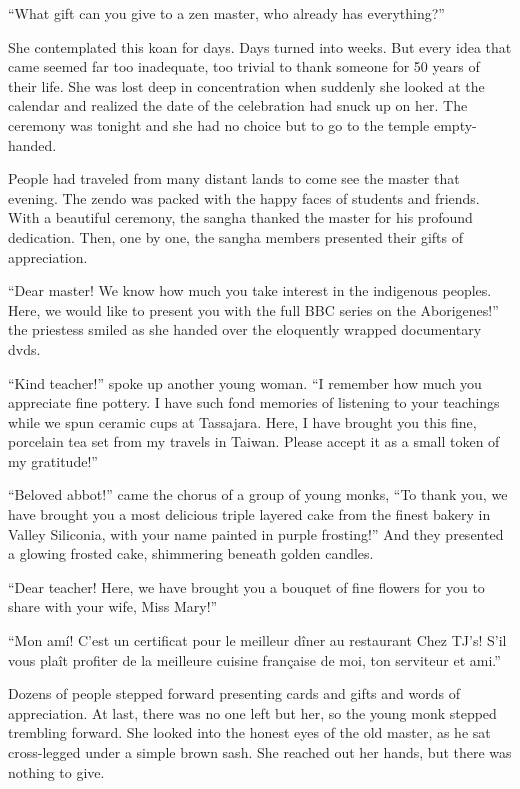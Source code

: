 \documentclass{book}
\begin{document}
``What gift can you give to a zen master, who already has everything?''

She contemplated this koan for days. Days turned into weeks. But every idea
that came seemed far too inadequate, too trivial to thank someone for 50 years
of their life. She was lost deep in concentration when suddenly she looked at
the calendar and realized the date of the celebration had snuck up on her. The
ceremony was tonight and she had no choice but to go to the temple
empty-handed.

People had traveled from many distant lands to come see the master that
evening. The zendo was packed with the happy faces of students and friends.
With a beautiful ceremony, the sangha thanked the master for his profound
dedication. Then, one by one, the sangha members presented their gifts of
appreciation. 

``Dear master! We know how much you take interest in the indigenous peoples.
Here, we would like to present you with the full BBC series on the
Aborigenes!'' the priestess smiled as she handed over the eloquently wrapped
documentary dvds. 

``Kind teacher!'' spoke up another young woman. ``I remember how much you
appreciate fine pottery. I have such fond memories of listening to your
teachings while we spun ceramic cups at Tassajara. Here, I have brought you
this fine, porcelain tea set from my travels in Taiwan. Please accept it as a
small token of my gratitude!''

``Beloved abbot!'' came the chorus of a group of young monks, ``To thank you,
we have brought you a most delicious triple layered cake from the finest bakery
in Valley Siliconia, with your name painted in purple frosting!'' And they
presented a glowing frosted cake, shimmering beneath golden candles.

``Dear teacher! Here, we have brought you a bouquet of fine flowers for you to
share with your wife, Miss Mary!''

``Mon am\'i! C'est un certificat pour le meilleur d\^iner au restaurant Chez
TJ's!  S'il vous pla\^it profiter de la meilleure cuisine fran\c caise de moi,
ton serviteur et ami.''

Dozens of people stepped forward presenting cards and gifts and words of
appreciation. At last, there was no one left but her, so the young monk stepped
trembling forward. She looked into the honest eyes of the old master, as he sat
cross-legged under a simple brown sash. She reached out her hands, but there
was nothing to give. 
\end{document}
